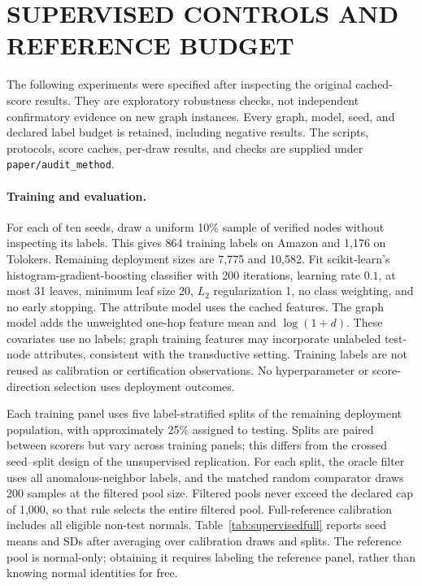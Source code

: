 \section{SUPERVISED CONTROLS AND REFERENCE BUDGET}
\label{app:supervised}
The following experiments were specified after inspecting the original cached-score results. They are exploratory robustness checks, not independent confirmatory evidence on new graph instances. Every graph, model, seed, and declared label budget is retained, including negative results. The scripts, protocols, score caches, per-draw results, and checks are supplied under \texttt{paper/audit\_method}.

\paragraph{Training and evaluation.}
For each of ten seeds, draw a uniform 10\% sample of verified nodes without inspecting its labels. This gives 864 training labels on Amazon and 1,176 on Tolokers. Remaining deployment sizes are 7,775 and 10,582. Fit scikit-learn's histogram-gradient-boosting classifier with 200 iterations, learning rate $0.1$, at most 31 leaves, minimum leaf size 20, $L_2$ regularization 1, no class weighting, and no early stopping. The attribute model uses the cached features. The graph model adds the unweighted one-hop feature mean and $\log(1+d)$. These covariates use no labels; graph training features may incorporate unlabeled test-node attributes, consistent with the transductive setting. Training labels are not reused as calibration or certification observations. No hyperparameter or score-direction selection uses deployment outcomes.

Each training panel uses five label-stratified splits of the remaining deployment population, with approximately 25\% assigned to testing. Splits are paired between scorers but vary across training panels; this differs from the crossed seed--split design of the unsupervised replication. For each split, the oracle filter uses all anomalous-neighbor labels, and the matched random comparator draws 200 samples at the filtered pool size. Filtered pools never exceed the declared cap of 1,000, so that rule selects the entire filtered pool. Full-reference calibration includes all eligible non-test normals. Table~\ref{tab:supervisedfull} reports seed means and SDs after averaging over calibration draws and splits. The reference pool is normal-only; obtaining it requires labeling the reference panel, rather than knowing normal identities for free.

